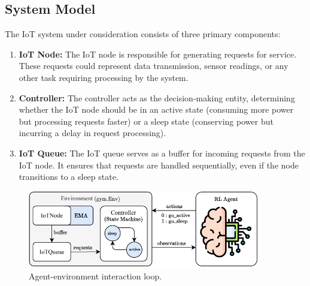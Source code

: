 \documentclass[11pt,a4paper]{article}
\begin{document}
\subsection{System Model}
The IoT system under consideration consists of three primary components:
\begin{enumerate}
    \item \textbf{IoT Node:} The IoT node is responsible for generating requests for service. These requests could represent data transmission, sensor readings, or any other task requiring processing by the system.
    \item \textbf{Controller:} The controller acts as the decision-making entity, determining whether the IoT node should be in an active state (consuming more power but processing requests faster) or a sleep state (conserving power but incurring a delay in request processing).
    \item \textbf{IoT Queue:} The IoT queue serves as a buffer for incoming requests from the IoT node. It ensures that requests are handled sequentially, even if the node transitions to a sleep state.
\end{enumerate}

\begin{figure}[t!]
    \centering
    \includegraphics[width=0.9\textwidth]{figs/block.pdf}
    \caption{Agent-environment interaction loop.}
    \label{fig:loop}
\end{figure}
\end{document}
